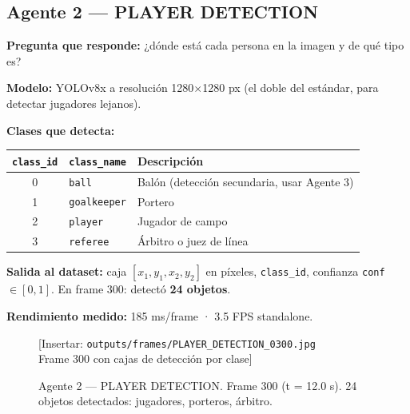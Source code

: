 \documentclass[11pt,a4paper]{article}
\begin{document}
\subsection{Agente 2 — PLAYER DETECTION}

\textbf{Pregunta que responde:} ¿dónde está cada persona en la imagen
y de qué tipo es?

\textbf{Modelo:} YOLOv8x a resolución 1280$\times$1280 px (el doble del
estándar, para detectar jugadores lejanos).

\textbf{Clases que detecta:}

\begin{center}
\begin{tabular}{cll}
\toprule
\texttt{class\_id} & \texttt{class\_name} & Descripción \\
\midrule
0 & \texttt{ball}       & Balón (detección secundaria, usar Agente 3) \\
1 & \texttt{goalkeeper} & Portero \\
2 & \texttt{player}     & Jugador de campo \\
3 & \texttt{referee}    & Árbitro o juez de línea \\
\bottomrule
\end{tabular}
\end{center}

\textbf{Salida al dataset:} caja $[x_1, y_1, x_2, y_2]$ en píxeles,
\texttt{class\_id}, confianza \texttt{conf} $\in [0,1]$.
En frame 300: detectó \textbf{24 objetos}.

\textbf{Rendimiento medido:} 185 ms/frame · 3.5 FPS standalone.

\begin{figure}[H]
  \centering
  \begin{mdframed}[
    linecolor=gray!40, linewidth=1pt,
    innertopmargin=50pt, innerbottommargin=50pt,
    backgroundcolor=gray!8
  ]
    \centering\color{gray!60}
    [Insertar: \texttt{outputs/frames/PLAYER\_DETECTION\_0300.jpg} \\
    Frame 300 con cajas de detección por clase]
  \end{mdframed}
  \caption{Agente 2 — PLAYER DETECTION. Frame 300 (t = 12.0 s).
           24 objetos detectados: jugadores, porteros, árbitro.}
  \label{fig:player_det}
\end{figure}
\end{document}
